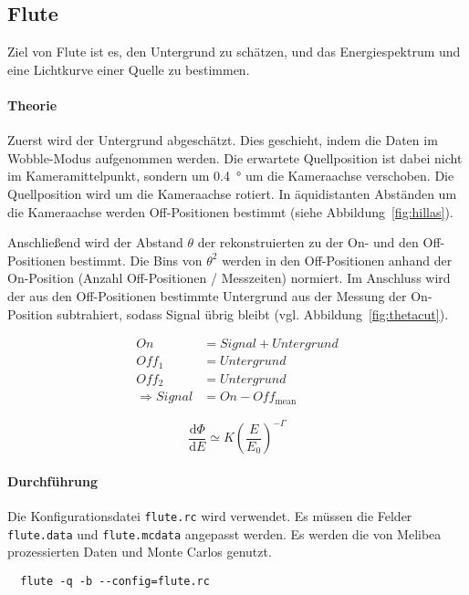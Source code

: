 \subsection{Flute}%
\label{sub:flute}

Ziel von Flute ist es,
den Untergrund zu schätzen,
und das Energiespektrum und
eine Lichtkurve einer Quelle zu bestimmen.

\paragraph{Theorie}%

Zuerst wird der Untergrund abgeschätzt.
Dies geschieht, indem die Daten im Wobble-Modus aufgenommen werden.
Die erwartete Quellposition ist dabei nicht im
Kameramittelpunkt,
sondern um
\SI{0.4}{\degree} um die Kameraachse
verschoben.
Die Quellposition wird um die Kameraachse rotiert.
In äquidistanten Abständen um die Kameraachse werden Off-Positionen bestimmt
(siehe Abbildung~\ref{fig:hillas}).

Anschließend wird der Abstand $\theta$ der rekonstruierten
zu der On- und den Off-Positionen bestimmt.
Die Bins von $\theta^2$ werden in den Off-Positionen
anhand der On-Position (Anzahl Off-Positionen / Messzeiten) normiert.
Im Anschluss wird der aus den Off-Positionen bestimmte Untergrund
aus der Messung der On-Position subtrahiert, sodass Signal übrig bleibt
(vgl. Abbildung~\ref{fig:thetacut}).

\begin{align}
    On &= Signal + Untergrund \\
    Off_{1} &= Untergrund \\
    Off_{2} &= Untergrund \\
    \Rightarrow Signal &= On - Off_{\text{mean}}
\end{align}


\begin{equation}
\frac{\text{d} \Phi}{\text{d}E} \simeq K {\left( \frac{E}{E_0} \right)}^{- \Gamma}
\end{equation}


\paragraph{Durchführung}%

Die Konfigurationsdatei \texttt{flute.rc} wird verwendet.
Es müssen die Felder \texttt{flute.data} und \texttt{flute.mcdata} angepasst werden.
Es werden die von Melibea prozessierten Daten und Monte Carlos genutzt.


\begin{lstlisting}
  flute -q -b --config=flute.rc
\end{lstlisting}
